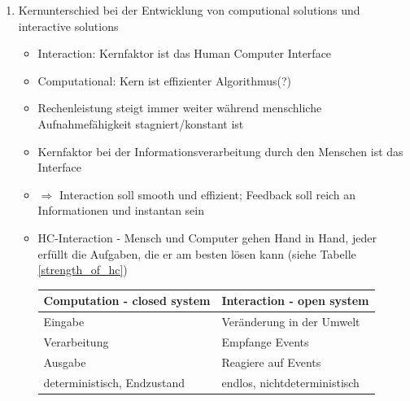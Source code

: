 \begin{enumerate}
	\item Kernunterschied bei der Entwicklung von computional solutions und interactive solutions
	\begin{itemize}
		\item Interaction: Kernfaktor ist das Human Computer Interface
		\item Computational: Kern ist effizienter Algorithmus(?)
		\item Rechenleistung steigt immer weiter während menschliche Aufnahmefähigkeit stagniert/konstant ist
		\item Kernfaktor bei der Informationsverarbeitung durch den Menschen ist das Interface
		\item $\Rightarrow$ Interaction soll smooth und effizient; Feedback soll reich an Informationen und instantan sein
		\item HC-Interaction - Mensch und Computer gehen Hand in Hand, jeder erfüllt die Aufgaben, die er am besten lösen kann (siehe Tabelle \ref{strength_of_hc})
		\begin{table}[!h]
			\centering
			\begin{tabular}{|l|l|}
				\hline
				\textbf{Computation} - closed system & \textbf{Interaction} - open system\\
				\hline
				\tabitem Eingabe & \tabitem Veränderung in der Umwelt\\
				\tabitem Verarbeitung & \tabitem Empfange Events\\
				\tabitem Ausgabe  & \tabitem Reagiere auf Events\\
				\tabitem deterministisch, Endzustand & \tabitem endlos, nichtdeterministisch\\
				\hline
			\end{tabular}
		\end{table}
	\end{itemize}
	

\end{enumerate}
